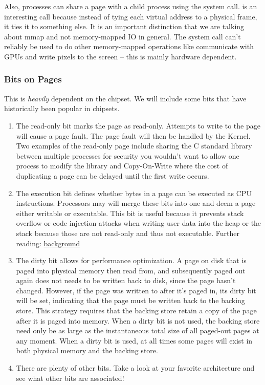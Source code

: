 Also, processes can share a page with a child process using the  system call.
 is an interesting call because instead of tying each virtual address to a physical frame, it ties it to something else. It is an important distinction that we are talking about mmap and not memory-mapped IO in general. The  system call can't reliably be used to do other memory-mapped operations like communicate with GPUs and write pixels to the screen -- this is mainly hardware dependent.

\subsubsection{Bits on Pages}

This is \textit{heavily} dependent on the chipset.
We will include some bits that have historically been popular in chipsets.

\begin{enumerate}
\item The read-only bit marks the page as read-only.
Attempts to write to the page will cause a page fault.
The page fault will then be handled by the Kernel.
Two examples of the read-only page include sharing the C standard library between multiple processes for security you wouldn't want to allow one process to modify the library and Copy-On-Write where the cost of duplicating a page can be delayed until the first write occurs.

\item The execution bit defines whether bytes in a page can be executed as CPU instructions.
Processors may will merge these bits into one and deem a page either writable or executable.
This bit is useful because it prevents stack overflow or code injection attacks when writing user data into the heap or the stack because those are not read-only and thus not executable.
Further reading: \href{http://en.wikipedia.org/wiki/NX\_bit\#Hardware\_background}{background}

\item The dirty bit allows for performance optimization.
A page on disk that is paged into physical memory then read from, and subsequently paged out again does not needs to be written back to disk, since the page hasn't changed.
However, if the page was written to after it's paged in, its dirty bit will be set, indicating that the page must be written back to the backing store.
This strategy requires that the backing store retain a copy of the page after it is paged into memory.
When a dirty bit is not used, the backing store need only be as large as the instantaneous total size of all paged-out pages at any moment.
When a dirty bit is used, at all times some pages will exist in both physical memory and the backing store.
\item There are plenty of other bits. Take a look at your favorite architecture and see what other bits are associated!
\end{enumerate}

